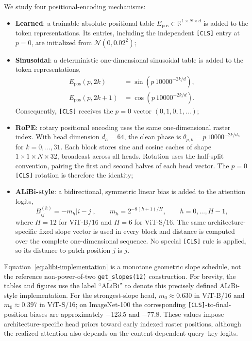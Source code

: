 \documentclass[preprint,12pt,authoryear]{elsarticle}
\begin{document}
We study four positional-encoding mechanisms:

\begin{itemize}

    \item \textbf{Learned}: a trainable absolute positional table
    $E_{\mathrm{pos}}\in\mathbb{R}^{1\times N\times d}$ is added to the
    token representations. Its entries, including the independent
    \texttt{[CLS]} entry at $p=0$, are initialized from
    $\mathcal{N}(0,0.02^2)$;

    \item \textbf{Sinusoidal}: a deterministic one-dimensional
    sinusoidal table is added to the token representations,
    \begin{align}
    E_{\mathrm{pos}}(p,2k)
    &=\sin\!\left(p\,10000^{-2k/d}\right),\\
    E_{\mathrm{pos}}(p,2k+1)
    &=\cos\!\left(p\,10000^{-2k/d}\right).
    \end{align}
    Consequently, \texttt{[CLS]} receives the $p=0$ vector
    $(0,1,0,1,\ldots)$;

    \item \textbf{RoPE}: rotary positional encoding uses the same
    one-dimensional raster index. With head dimension $d_h=64$, the
    clean phase is
    $\theta_{p,k}=p\,10000^{-2k/d_h}$ for $k=0,\ldots,31$.
    Each block stores sine and cosine caches of shape
    $1\times1\times N\times32$, broadcast across all heads. Rotation
    uses the half-split convention, pairing the first and second halves
    of each head vector. The $p=0$ \texttt{[CLS]} rotation is therefore
    the identity;

    \item \textbf{ALiBi-style}: a bidirectional, symmetric linear bias is
    added to the attention logits,
    \begin{equation}
    B^{(h)}_{ij}=-m_h|i-j|,
    \qquad
    m_h=2^{-8(h+1)/H},
    \qquad h=0,\ldots,H-1,
    \label{eq:alibi-implementation}
    \end{equation}
    where $H=12$ for ViT-B/16 and $H=6$ for ViT-S/16. The same
    architecture-specific fixed slope vector is used in every block and
    distance is computed over the complete one-dimensional sequence.
    No special \texttt{[CLS]} rule is applied, so its distance to patch
    position $j$ is $j$.

\end{itemize}

Equation~\eqref{eq:alibi-implementation} is a monotone geometric slope
schedule, not the reference non-power-of-two \texttt{get\_slopes(12)}
construction. For brevity, the tables and figures use the label ``ALiBi''
to denote this precisely defined ALiBi-style implementation. For the
strongest-slope head, $m_0\approx0.630$ in ViT-B/16 and
$m_0\approx0.397$ in ViT-S/16; on ImageNet-100 the corresponding
\texttt{[CLS]}-to-final-position biases are approximately $-123.5$ and
$-77.8$. These values impose architecture-specific head priors toward
early indexed raster positions, although the realized attention also
depends on the content-dependent query--key logits.
\end{document}
